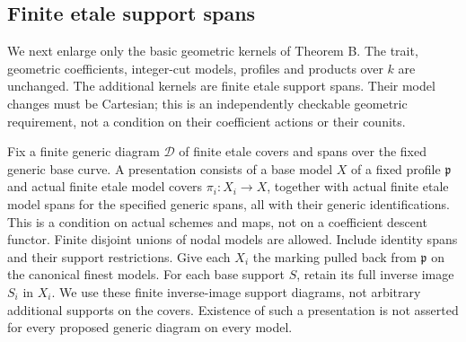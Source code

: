 \documentclass[11pt]{article}
\theoremstyle{definition}
\theoremstyle{remark}
\begin{document}
\subsection{Finite etale support spans}
\label{sec:etale-spans}
We next enlarge only the basic geometric kernels of Theorem B.
The trait, geometric coefficients, integer-cut models, profiles and
products over $k$ are unchanged. The additional kernels are finite
etale support spans. Their model changes must be Cartesian; this is
an independently checkable geometric requirement, not a condition
on their coefficient actions or their counits.

Fix a finite generic diagram $\mathcal D$ of finite etale covers and spans over
the fixed generic base curve. A presentation consists of a base
model $X$ of a fixed profile $\mathfrak p$ and actual finite etale
model covers $\pi_i:X_i\to X$, together with actual finite etale
model spans for the specified generic spans, all with their generic
identifications. This is a condition on actual schemes and maps,
not on a coefficient descent functor. Finite disjoint unions of
nodal models are allowed. Include identity spans and their support
restrictions. Give each $X_i$ the marking pulled back from
$\mathfrak p$ on the canonical finest models. For each base support
$S$, retain its full inverse image $S_i$ in $X_i$. We use these
finite inverse-image support diagrams, not arbitrary additional
supports on the covers. Existence of such a presentation is not
asserted for every proposed generic diagram on every model.
\end{document}
